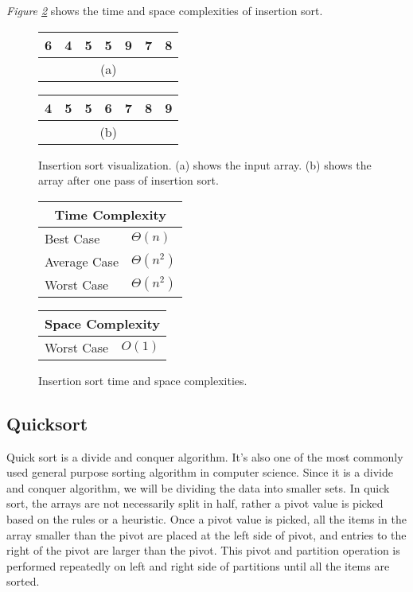 \textit{Figure \ref{fig:insertionsort}} shows the time and space complexities of insertion sort.

\begin{figure}[!ht]
    \centering
    \begin{tabular}{|c|c|c|c|c|c|c|}
    \hline
    6 & 4 & 5 & 5 & 9 & 7 & 8 \\
    \hline
    \multicolumn{7}{c}{(a)} \\
    \end{tabular}
    \quad\quad
    \begin{tabular}{|c|c|c|c|c|c|c|}
    \hline
    4 & 5 & 5 & 6 & 7 & 8 & 9 \\
    \hline
    \multicolumn{7}{c}{(b)} \\
    \end{tabular}
    
    \caption{Insertion sort visualization. (a) shows the input array. (b) shows the array after one pass of insertion sort.}
    \label{fig:insertionsort_ex}
\end{figure}

\begin{figure}[!ht]
    \centering
    \begin{tabular}{l|l}
    \multicolumn{2}{c}{\textbf{Time Complexity}} \\
    \hline
    Best Case    & $\Theta(n)$ \\
    Average Case & $\Theta(n^2)$ \\
    Worst Case   & $\Theta(n^2)$ \\
    \end{tabular}
    \quad\quad
    \begin{tabular}{l|l}
    \multicolumn{2}{c}{\textbf{Space Complexity}} \\
    \hline
    Worst Case   & $O(1)$ \\
    \end{tabular}
    
    \caption{Insertion sort time\cite{clrs2009} and space complexities\cite{big-o}.}
    \label{fig:insertionsort}
\end{figure}


\subsection{Quicksort}

Quick sort is a divide and conquer algorithm. It’s also one of the most commonly used general purpose sorting algorithm in computer science. Since it is a divide and conquer algorithm, we will be dividing the data into smaller sets. In quick sort, the arrays are not necessarily split in half, rather a pivot value is picked based on the rules or a heuristic. Once a pivot value is picked, all the items in the array smaller than the pivot are placed at the left side of pivot, and entries to the right of the pivot are larger than the pivot. This pivot and partition operation is performed repeatedly on left and right side of partitions until all the items are sorted. 


